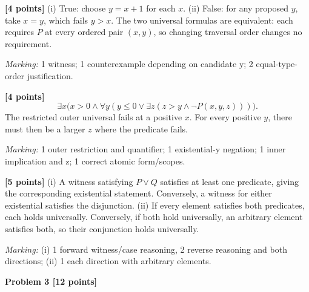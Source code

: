 \documentclass[12pt,letterpaper]{article}
\newcommand{\problemheading}[2][5\baselineskip]{\Needspace{#1}\par\noindent\hspace*{-0.625in}\textbf{#2}\par\nobreak\vspace{0.3em}}
\begin{document}
\begin{description}[font=\normalfont,leftmargin=1.2em,labelsep=0.4em]
\item[(a)] \textbf{[4 points]} (i) True: choose $y=x+1$ for each $x$. (ii) False: for any proposed $y$, take $x=y$, which fails $y>x$. The two universal formulas are equivalent: each requires $P$ at every ordered pair $(x,y)$, so changing traversal order changes no requirement.
\par\textit{Marking:} 1 witness; 1 counterexample depending on candidate y; 2 equal-type-order justification.
\item[(b)] \textbf{[4 points]} \[\exists x\bigl(x>0\land\forall y(y\le0\lor\exists z(z>y\land\neg P(x,y,z)))\bigr).\] The restricted outer universal fails at a positive $x$. For every positive $y$, there must then be a larger $z$ where the predicate fails.
\par\textit{Marking:} 1 outer restriction and quantifier; 1 existential-y negation; 1 inner implication and z; 1 correct atomic form/scopes.
\item[(c)] \textbf{[5 points]} (i) A witness satisfying $P\lor Q$ satisfies at least one predicate, giving the corresponding existential statement. Conversely, a witness for either existential satisfies the disjunction. (ii) If every element satisfies both predicates, each holds universally. Conversely, if both hold universally, an arbitrary element satisfies both, so their conjunction holds universally.
\par\textit{Marking:} (i) 1 forward witness/case reasoning, 2 reverse reasoning and both directions; (ii) 1 each direction with arbitrary elements.
\end{description}
\vspace{0.65em}
\problemheading[\dimexpr 3\baselineskip+4\baselineskip\relax]{Problem 3 [12 points]}
\end{document}
